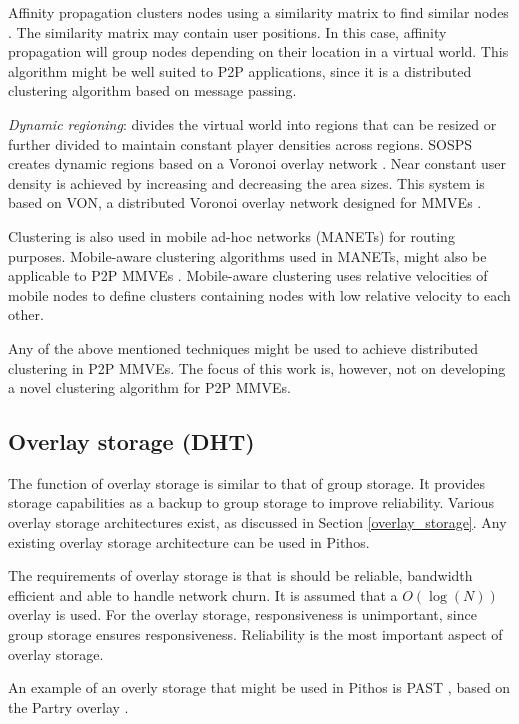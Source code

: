 Affinity propagation clusters nodes using a similarity matrix to find similar nodes \cite{affinity_propagation}. The similarity matrix may contain user positions. In this case, affinity propagation will group nodes depending on their location in a virtual world. This algorithm might be well suited to P2P applications, since it is a distributed clustering algorithm based on message passing.

\emph{Dynamic regioning}: divides the virtual world into regions that can be resized or further divided to maintain constant player densities across regions. SOSPS \cite{self_organising_sps_post} creates dynamic regions based on a Voronoi overlay network \cite{voronoi_diagrams_survey}. Near constant user density is achieved by increasing and decreasing the area sizes. This system is based on VON, a distributed Voronoi overlay network designed for MMVEs \cite{VON_VAST}.

Clustering is also used in mobile ad-hoc networks (MANETs) for routing purposes. Mobile-aware clustering algorithms used in MANETs, might also be applicable to P2P MMVEs \cite{clustering_survey}. Mobile-aware clustering uses relative velocities of mobile nodes to define clusters containing nodes with low relative velocity to each other.

Any of the above mentioned techniques might be used to achieve distributed clustering in P2P MMVEs. The focus of this work is, however, not on developing a novel clustering algorithm for P2P MMVEs.

\subsection{Overlay storage (DHT)}

The function of overlay storage is similar to that of group storage. It provides storage capabilities as a backup to group storage to improve reliability. Various overlay storage architectures exist, as discussed in Section \ref{overlay_storage}. Any existing overlay storage architecture can be used in Pithos.

The requirements of overlay storage is that is should be reliable, bandwidth efficient and able to handle network churn. It is assumed that a $O(\log(N))$ overlay is used. For the overlay storage, responsiveness is unimportant, since group storage ensures responsiveness. Reliability is the most important aspect of overlay storage.

An example of an overly storage that might be used in Pithos is PAST \cite{PAST_storage}, based on the Partry overlay \cite{pastry}.

